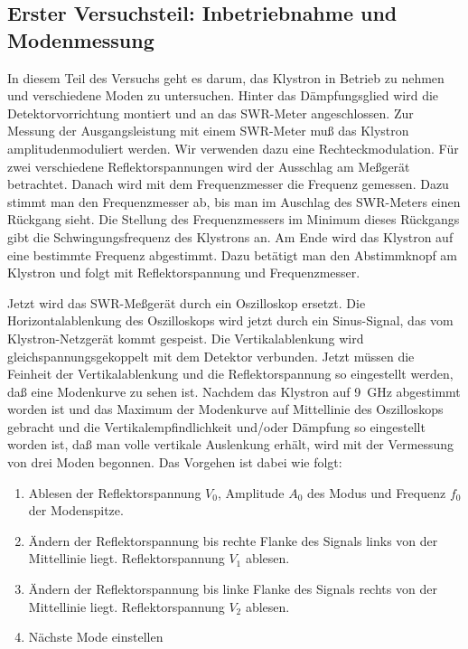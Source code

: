 \subsection{Erster Versuchsteil: Inbetriebnahme und Modenmessung}

In diesem Teil des Versuchs geht es darum, das Klystron in Betrieb zu
nehmen und verschiedene Moden zu untersuchen.  Hinter das Dämpfungsglied
wird die Detektorvorrichtung montiert und an das SWR-Meter
angeschlossen.  Zur Messung der Ausgangsleistung mit einem SWR-Meter muß
das Klystron amplitudenmoduliert werden.  Wir verwenden dazu eine
Rechteckmodulation.  Für zwei verschiedene Reflektorspannungen wird der
Ausschlag am Meßgerät betrachtet.  Danach wird mit dem Frequenzmesser
die Frequenz gemessen.  Dazu stimmt man den Frequenzmesser ab, bis man
im Auschlag des SWR-Meters einen Rückgang sieht.  Die Stellung des
Frequenzmessers im Minimum dieses Rückgangs gibt die Schwingungsfrequenz
des Klystrons an.  Am Ende wird das Klystron auf eine bestimmte Frequenz
abgestimmt.  Dazu betätigt man den Abstimmknopf am Klystron und folgt
mit Reflektorspannung und Frequenzmesser.

Jetzt wird das SWR-Meßgerät durch ein Oszilloskop ersetzt.  Die
Horizontalablenkung des Oszilloskops wird jetzt durch ein Sinus-Signal,
das vom Klystron-Netzgerät kommt gespeist.  Die Vertikalablenkung wird
gleichspannungsgekoppelt mit dem Detektor verbunden.  Jetzt müssen die
Feinheit der Vertikalablenkung und die Reflektorspannung so eingestellt
werden, daß eine Modenkurve zu sehen ist.  Nachdem das Klystron auf
\SI{9}{GHz} abgestimmt worden ist und das Maximum der Modenkurve auf
Mittellinie des Oszilloskops gebracht und die Vertikalempfindlichkeit
und/oder Dämpfung so eingestellt worden ist, daß man volle vertikale
Auslenkung erhält, wird mit der Vermessung von drei Moden begonnen.  Das
Vorgehen ist dabei wie folgt:
%
\begin{enumerate}
\item Ablesen der Reflektorspannung $V_0$, Amplitude $A_0$ des Modus und
  Frequenz $f_0$ der Modenspitze.
\item Ändern der Reflektorspannung bis rechte Flanke des Signals links
  von der Mittellinie liegt.  Reflektorspannung $V_1$ ablesen.
\item Ändern der Reflektorspannung bis linke Flanke des Signals rechts
  von der Mittellinie liegt.  Reflektorspannung $V_2$ ablesen.
\item Nächste Mode einstellen
\end{enumerate}

